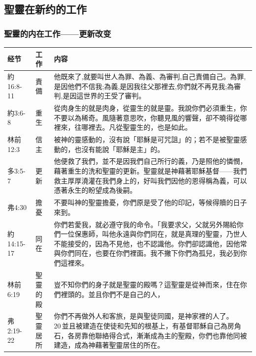 \subsection{聖靈在新约的工作}
\subsubsection{聖靈的内在工作——更新改变}
\begin{table}[H]
\centering
\begin{tabular}{p{6em}|p{4em}|p{37em}}  \toprule
经节&工作&内容 \\  \midrule
約16:8-11&責備&他既來了,就要叫世人為罪、為義、為審判,自己責備自己。為罪,是因他們不信我;為義,是因我往父那裡去,你們就不再見我;為審判,是因這世界的王受了審判。\\  \midrule

約3:6-8&重生&從肉身生的就是肉身，從靈生的就是靈。我說你們必須重生，你不要以為稀奇。風隨著意思吹，你聽見風的響聲，卻不曉得從哪裡來，往哪裡去。凡從聖靈生的，也是如此。\\  \midrule
林前12:3&信主&被神的靈感動的，沒有說「耶穌是可咒詛」的；若不是被聖靈感動的，也沒有能說「耶穌是主」的。\\  \midrule
多3:5-7&更新&他便救了我們，並不是因我們自己所行的義，乃是照他的憐憫，藉著重生的洗和聖靈的更新。聖靈就是神藉著耶穌基督——我們救主厚厚澆灌在我們身上的，好叫我們因他的恩得稱為義，可以憑著永生的盼望成為後嗣。\\  \midrule
弗4:30&擔憂&不要叫神的聖靈擔憂，你們原是受了他的印記，等候得贖的日子來到。\\  \midrule

約14:15-17&同在&你們若愛我，就必遵守我的命令。「我要求父，父就另外賜給你們一位保惠師，叫他永遠與你們同在，就是真理的聖靈，乃世人不能接受的，因為不見他，也不認識他。你們卻認識他，因他常與你們同在，也要在你們裡面。我不撇下你們為孤兒，我必到你們這裡來。\\  \midrule

林前6:19&聖靈的殿&豈不知你們的身子就是聖靈的殿嗎？這聖靈是從神而來，住在你們裡頭的。並且你們不是自己的人，\\  \midrule
弗2:19-22&聖靈居所&你們不再做外人和客旅，是與聖徒同國，是神家裡的人了。 20 並且被建造在使徒和先知的根基上，有基督耶穌自己為房角石，各房靠他聯絡得合式，漸漸成為主的聖殿，你們也靠他同被建造，成為神藉著聖靈居住的所在。\\  \midrule




\end{tabular}
\end{table}
